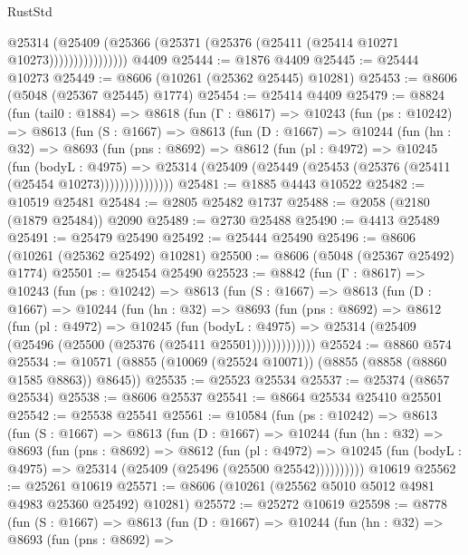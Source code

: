 \begin{lexlean}{RustStd}
\begin{coremodule}
                      @25314
                        (@25409
                          (@25366 (@25371 (@25376 (@25411 (@25414 @10271 @10273))))))))))))))))
    @4409
@25444 := @1876 @4409
@25445 := @25444 @10273
@25449 := @8606 (@10261 (@25362 @25445) @10281)
@25453 := @8606 (@5048 (@25367 @25445) @1774)
@25454 := @25414 @4409
@25479 := @8824
    (fun (tail0 : @1884) =>
    @8618
      (fun (Γ : @8617) =>
      @10243
        (fun (ps : @10242) =>
        @8613
          (fun (S : @1667) =>
          @8613
            (fun (D : @1667) =>
            @10244
              (fun (hn : @32) =>
              @8693
                (fun (pns : @8692) =>
                @8612
                  (fun (pl : @4972) =>
                  @10245
                    (fun (bodyL : @4975) =>
                    @25314 (@25409 (@25449 (@25453 (@25376 (@25411 (@25454 @10273)))))))))))))))
@25481 := @1885 @4443 @10522
@25482 := @10519 @25481
@25484 := @2805 @25482 @1737
@25488 := @2058 (@2180 (@1879 @25484)) @2090
@25489 := @2730 @25488
@25490 := @4413 @25489
@25491 := @25479 @25490
@25492 := @25444 @25490
@25496 := @8606 (@10261 (@25362 @25492) @10281)
@25500 := @8606 (@5048 (@25367 @25492) @1774)
@25501 := @25454 @25490
@25523 := @8842
    (fun (Γ : @8617) =>
    @10243
      (fun (ps : @10242) =>
      @8613
        (fun (S : @1667) =>
        @8613
          (fun (D : @1667) =>
          @10244
            (fun (hn : @32) =>
            @8693
              (fun (pns : @8692) =>
              @8612
                (fun (pl : @4972) =>
                @10245
                  (fun (bodyL : @4975) =>
                  @25314 (@25409 (@25496 (@25500 (@25376 (@25411 @25501)))))))))))))
@25524 := @8860 @574
@25534 := @10571 (@8855 (@10069 (@25524 @10071)) (@8855 (@8858 (@8860 @1585 @8863)) @8645))
@25535 := @25523 @25534
@25537 := @25374 (@8657 @25534)
@25538 := @8606 @25537
@25541 := @8664 @25534 @25410 @25501
@25542 := @25538 @25541
@25561 := @10584
    (fun (ps : @10242) =>
    @8613
      (fun (S : @1667) =>
      @8613
        (fun (D : @1667) =>
        @10244
          (fun (hn : @32) =>
          @8693
            (fun (pns : @8692) =>
            @8612
              (fun (pl : @4972) =>
              @10245 (fun (bodyL : @4975) => @25314 (@25409 (@25496 (@25500 @25542))))))))))
    @10619
@25562 := @25261 @10619
@25571 := @8606 (@10261 (@25562 @5010 @5012 @4981 @4983 @25360 @25492) @10281)
@25572 := @25272 @10619
@25598 := @8778
    (fun (S : @1667) =>
    @8613
      (fun (D : @1667) =>
      @10244
        (fun (hn : @32) =>
        @8693
          (fun (pns : @8692) =>

\end{coremodule}
\end{lexlean}
